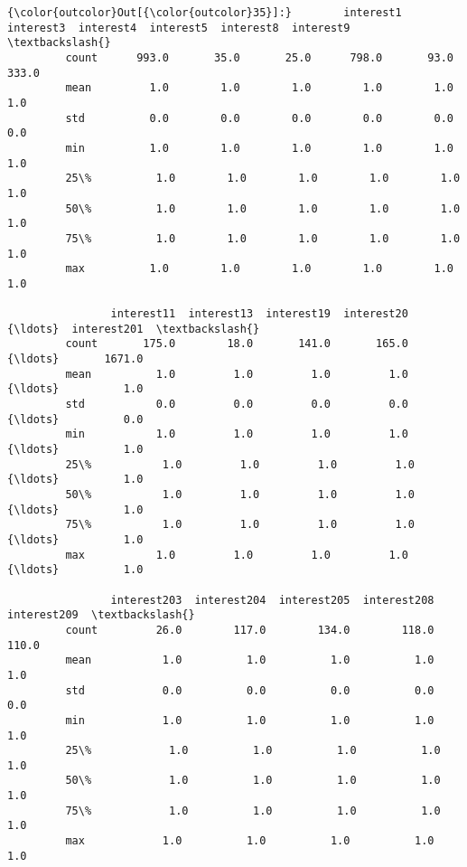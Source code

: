 \documentclass[11pt]{article}
\begin{document}
\begin{Verbatim}[commandchars=\\\{\}]
{\color{outcolor}Out[{\color{outcolor}35}]:}        interest1  interest3  interest4  interest5  interest8  interest9  \textbackslash{}
         count      993.0       35.0       25.0      798.0       93.0      333.0   
         mean         1.0        1.0        1.0        1.0        1.0        1.0   
         std          0.0        0.0        0.0        0.0        0.0        0.0   
         min          1.0        1.0        1.0        1.0        1.0        1.0   
         25\%          1.0        1.0        1.0        1.0        1.0        1.0   
         50\%          1.0        1.0        1.0        1.0        1.0        1.0   
         75\%          1.0        1.0        1.0        1.0        1.0        1.0   
         max          1.0        1.0        1.0        1.0        1.0        1.0   
         
                interest11  interest13  interest19  interest20  {\ldots}  interest201  \textbackslash{}
         count       175.0        18.0       141.0       165.0  {\ldots}       1671.0   
         mean          1.0         1.0         1.0         1.0  {\ldots}          1.0   
         std           0.0         0.0         0.0         0.0  {\ldots}          0.0   
         min           1.0         1.0         1.0         1.0  {\ldots}          1.0   
         25\%           1.0         1.0         1.0         1.0  {\ldots}          1.0   
         50\%           1.0         1.0         1.0         1.0  {\ldots}          1.0   
         75\%           1.0         1.0         1.0         1.0  {\ldots}          1.0   
         max           1.0         1.0         1.0         1.0  {\ldots}          1.0   
         
                interest203  interest204  interest205  interest208  interest209  \textbackslash{}
         count         26.0        117.0        134.0        118.0        110.0   
         mean           1.0          1.0          1.0          1.0          1.0   
         std            0.0          0.0          0.0          0.0          0.0   
         min            1.0          1.0          1.0          1.0          1.0   
         25\%            1.0          1.0          1.0          1.0          1.0   
         50\%            1.0          1.0          1.0          1.0          1.0   
         75\%            1.0          1.0          1.0          1.0          1.0   
         max            1.0          1.0          1.0          1.0          1.0   
         

\end{Verbatim}
\end{document}
